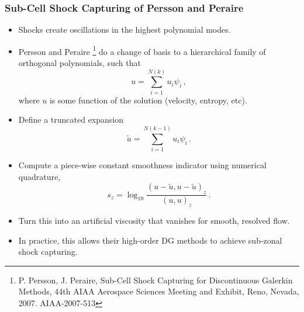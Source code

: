 \documentclass[8pt,xcolor=svgnames]{beamer}
\begin{document}
\begin{frame}\frametitle{Sub-Cell Shock Capturing of Persson and Peraire}
\begin{itemize}
\item Shocks create oscillations in the highest polynomial modes.
\item Persson and Peraire
\footnote{P. Persson, J. Peraire, Sub-Cell Shock Capturing for Discontinuous
Galerkin Methods, 44th AIAA Aerospace Sciences Meeting and Exhibit, Reno,
Nevada, 2007. AIAA-2007-513}
do a change of basis to a hierarchical family of orthogonal polynomials, such that
\[
u=\sum_{i=1}^{N(k)}u_{i}\psi_i\,,
\]
where $u$ is some function of the solution (velocity, entropy, etc).
\item Define a truncated expansion
\[
\tilde u=\sum_{i=1}^{N(k-1)}u_{i}\psi_i\,.
\]
\item Compute a piece-wise constant smoothness indicator using numerical quadrature,
\[
s_z=\log_{10}\frac{(u-\tilde u,u-\tilde u)_z}{(u,u)_z}\,.
\]
\item Turn this into an artificial viscosity that vanishes for smooth, resolved flow.
\item In practice, this allows their high-order DG methods to achieve sub-zonal shock capturing.
\end{itemize}
\end{frame}

\end{document}
